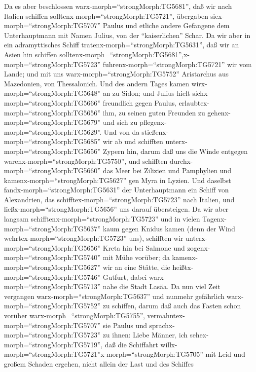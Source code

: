  Da es aber beschlossen warx-morph=``strongMorph:TG5681'',
daß wir nach Italien schiffen solltenx-morph=``strongMorph:TG5721'',
übergaben siex-morph=``strongMorph:TG5707'' Paulus und etliche andere
Gefangene dem Unterhauptmann mit Namen Julius, von der ``kaiserlichen''
Schar.  Da wir aber in ein adramyttisches Schiff
tratenx-morph=``strongMorph:TG5631'', daß wir an Asien hin schiffen
solltenx-morph=``strongMorph:TG5681'',x-morph=``strongMorph:TG5723''
fuhrenx-morph=``strongMorph:TG5721'' wir vom Lande; und mit uns
warx-morph=``strongMorph:TG5752'' Aristarchus aus Mazedonien, von
Thessalonich.  Und des andern Tages kamen
wirx-morph=``strongMorph:TG5648'' an zu Sidon; und Julius hielt
sichx-morph=``strongMorph:TG5666'' freundlich gegen Paulus,
erlaubtex-morph=``strongMorph:TG5656'' ihm, zu seinen guten Freunden zu
gehenx-morph=``strongMorph:TG5679'' und sich zu
pflegenx-morph=``strongMorph:TG5629''.  Und von da
stießenx-morph=``strongMorph:TG5685'' wir ab und schifften
unterx-morph=``strongMorph:TG5656'' Zypern hin, darum daß uns die Winde
entgegen warenx-morph=``strongMorph:TG5750'',  und schifften
durchx-morph=``strongMorph:TG5660'' das Meer bei Zilizien und Pamphylien
und kamenx-morph=``strongMorph:TG5627'' gen Myra in Lyzien. 
Und daselbst fandx-morph=``strongMorph:TG5631'' der Unterhauptmann ein
Schiff von Alexandrien, das schifftex-morph=``strongMorph:TG5723'' nach
Italien, und ließx-morph=``strongMorph:TG5656'' uns darauf übersteigen.
 Da wir aber langsam schifftenx-morph=``strongMorph:TG5723''
und in vielen Tagenx-morph=``strongMorph:TG5637'' kaum gegen Knidus
kamen (denn der Wind wehrtex-morph=``strongMorph:TG5723'' uns),
schifften wir unterx-morph=``strongMorph:TG5656'' Kreta hin bei Salmone
 und zogenx-morph=``strongMorph:TG5740'' mit Mühe vorüber;
da kamenx-morph=``strongMorph:TG5627'' wir an eine Stätte, die
heißtx-morph=``strongMorph:TG5746'' Gutfurt, dabei
warx-morph=``strongMorph:TG5713'' nahe die Stadt Lasäa.  Da
nun viel Zeit vergangen warx-morph=``strongMorph:TG5637'' und nunmehr
gefährlich warx-morph=``strongMorph:TG5752'' zu schiffen, darum daß auch
das Fasten schon vorüber warx-morph=``strongMorph:TG5755'',
vermahntex-morph=``strongMorph:TG5707'' sie Paulus  und
sprachx-morph=``strongMorph:TG5723'' zu ihnen: Liebe Männer, ich
sehex-morph=``strongMorph:TG5719'', daß die Schiffahrt
willx-morph=``strongMorph:TG5721''x-morph=``strongMorph:TG5705'' mit
Leid und großem Schaden ergehen, nicht allein der Last und des Schiffes
